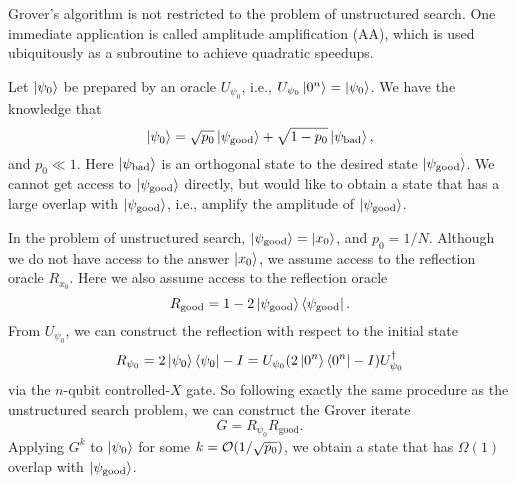 Grover's algorithm is not restricted to the problem of unstructured search.
One immediate application is called amplitude amplification (AA), which is used ubiquitously as a subroutine to achieve quadratic speedups.

Let \(\ket{\psi_0}\) be prepared by an oracle $U_{\psi_0}$, i.e., $U_{\psi_0}\ket{0^n}=\ket{\psi_0}$.
We have the knowledge that
\begin{equation}
\ket{\psi_0}=\sqrt{p_0} \ket{\psi_{\mathrm{good}}}+\sqrt{1-p_0} \ket{\psi_{\mathrm{bad}}},
\end{equation}
and $p_0\ll 1$. Here $\ket{\psi_{\mathrm{bad}}}$ is an orthogonal state to the desired state $\ket{\psi_{\mathrm{good}}}$.
We cannot get access to $\ket{\psi_{\mathrm{good}}}$ directly, but would like to obtain a state that has a large overlap with $\ket{\psi_{\mathrm{good}}}$, i.e., amplify the amplitude of $\ket{\psi_{\mathrm{good}}}$.



In the problem of unstructured search, $\ket{\psi_{\mathrm{good}}}=\ket{x_0}$,
and $p_0=1/N$. 
Although we do not have access to the answer $\ket{x_0}$, we assume access to the reflection oracle $R_{x_0}$.
Here we also assume access to the reflection oracle
\begin{equation}
R_{\mathrm{good}}=1-2\ket{\psi_{\mathrm{good}}}\bra{\psi_{\mathrm{good}}}.
\end{equation}
From $U_{\psi_0}$, we can construct the reflection with respect to the initial state
\begin{equation}\label{eqn:R_psi0}
R_{\psi_0}=2\ket{\psi_0}\bra{\psi_0}-I=U_{\psi_0}(2\ket{0^n}\bra{0^n}-I)U^{\dag}_{\psi_0}
\end{equation}
via the $n$-qubit controlled-$X$ gate.
So following exactly the same procedure as the unstructured search problem, we can construct the Grover iterate
\begin{equation}
G=R_{\psi_0}R_{\mathrm{good}}.
\end{equation}
Applying $G^k$ to $\ket{\psi_0}$ for some $k=\mathcal{O}(1/\sqrt{p_0})$, we obtain a state that has $\Omega(1)$ overlap with $\ket{\psi_{\mathrm{good}}}$.

